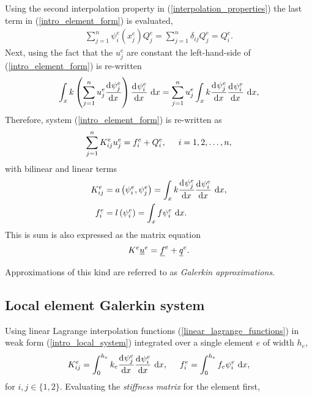 Using the second interpolation property in (\ref{interpolation_properties}) the last term in (\ref{intro_element_form}) is evaluated,
\begin{align*}
  \sum_{j=1}^n \psi_i^e(x_j^e) Q_j^e = \sum_{j=1}^n \delta_{ij} Q_j^e = Q_i^e.
\end{align*}
Next, using the fact that the $u_j^e$ are constant the left-hand-side of (\ref{intro_element_form}) is re-written
\begin{align*}
  \int_x k \left( \sum_{j=1}^n u_j^e \frac{\mathrm{d}^{} \psi_j^e}{\mathrm{d} x^{} } \right) \frac{\mathrm{d}^{} \psi_i^e}{\mathrm{d} x^{} } \ \mathrm{d}x =  \sum_{j=1}^n u_j^e \int_x k \frac{\mathrm{d}^{} \psi_j^e}{\mathrm{d} x^{} } \frac{\mathrm{d}^{} \psi_i^e}{\mathrm{d} x^{} } \ \mathrm{d}x, 
\end{align*}
Therefore, system (\ref{intro_element_form}) is re-written as
\begin{align*}
  \sum_{j=1}^n K_{ij}^e u_j^e = f_i^e + Q_i^e, \hspace{5mm} i = 1,2,\ldots,n,
\end{align*}
with bilinear and linear terms
\begin{align*}
  K_{ij}^e &= a\left( \psi_i^e, \psi_j^e \right) = \int_x k \frac{\mathrm{d}^{} \psi_j^e}{\mathrm{d} x^{} } \frac{\mathrm{d}^{} \psi_i^e}{\mathrm{d} x^{} } \ \mathrm{d}x, \\
  f_i^e &= l\left( \psi_i^e \right) = \int_x f \psi_i^e \ \mathrm{d}x.
\end{align*}
This is sum is also expressed as the matrix equation
\begin{align}
  \label{intro_local_system}
  K^e \underline{u}^e = \underline{f}^e + \underline{q}^e.
\end{align}

Approximations of this kind are referred to as \emph{Galerkin approximations}.

\subsection{Local element Galerkin system} \label{ssn_local_galerkin_assembly}

Using linear Lagrange interpolation functions (\ref{linear_lagrange_functions}) in weak form (\ref{intro_local_system}) integrated over a single element $e$ of width $h_e$,
\begin{align*}
  K_{ij}^e = \int_0^{h_e} k_e \frac{\mathrm{d}^{} \psi_j^e}{\mathrm{d} x^{} } \frac{\mathrm{d}^{} \psi_i^e}{\mathrm{d} x^{} } \ \mathrm{d}x, \hspace{5mm} f_i^e = \int_0^{h_e} f_e \psi_i^e \ \mathrm{d}x,
\end{align*}
for $i,j \in \{1,2\}$.
Evaluating the  \emph{stiffness matrix} for the element first,

